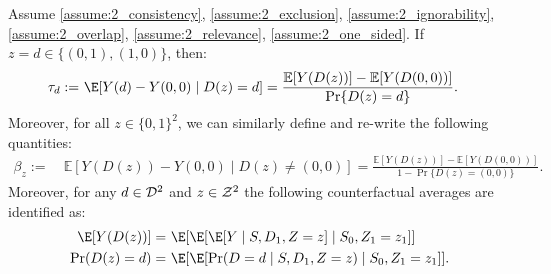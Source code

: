 \begin{theorem}\label{thm:2_identification}
Assume
 \ref{assume:2_consistency}, 
 \ref{assume:2_exclusion},
 \ref{assume:2_ignorability}, \ref{assume:2_overlap}, \ref{assume:2_relevance}, \ref{assume:2_one_sided}.
If $z=d\in\{(0,1), (1,0)\}$, then: 
\begin{align*}
\tau_d :=~& \E[Y(d) - Y(0,0) \mid D(z)=d]
 =\frac{
    \mathbb{E}[Y(D(z)) ]
    - \mathbb{E}[Y(D(0,0)) ]
  }{\Pr\{ D(z)=d \}
  }.
\end{align*}
Moreover, for all $z \in \{0,1\}^2$, we can similarly define and re-write the following quantities: 
\begin{align*}
\beta_z :=~& \mathbb{E}[Y(D(z)) - Y(0,0) \mid D(z) \neq (0,0)]
 =\frac{
    \mathbb{E}[ Y(D(z)) ]
    - \mathbb{E}[ Y(D(0,0)) ]
  }{1 - \Pr\{ D(z)=(0,0) \}
  }.
\end{align*}
Moreover, for any $d\in {\cal D}^2$ and $z\in {\cal Z}^2$ the following counterfactual averages are identified as: 
\begin{align}
\E[Y(D(z))]
=~& \E[\E[\E[Y \mid S, D_1, Z=z] \mid S_0, Z_1=z_1]]\\
\Pr(D(z)=d)
=~& \E[\E[\Pr(D=d\mid S, D_1, Z=z)\mid S_0, Z_1=z_1]].\label{eqn:id_d_cnt}
\end{align}
\end{theorem}

